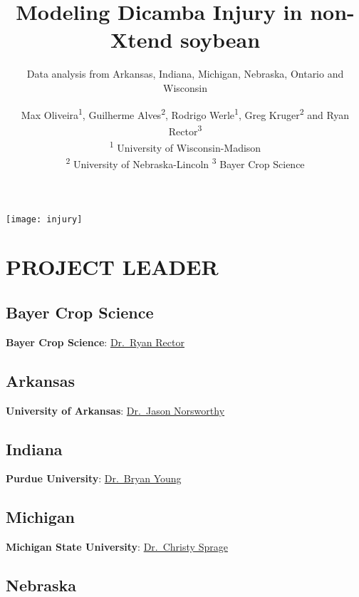 \documentclass[]{article}
\title{Modeling Dicamba Injury in non-Xtend soybean}
\subtitle{Data analysis from Arkansas, Indiana, Michigan, Nebraska, Ontario and
Wisconsin}
\author{Max Oliveira\textsuperscript{1}, Guilherme Alves\textsuperscript{2},
Rodrigo Werle\textsuperscript{1}, Greg Kruger\textsuperscript{2} and
Ryan Rector\textsuperscript{3}\\
\textsuperscript{1} University of Wisconsin-Madison\\
\textsuperscript{2} University of Nebraska-Lincoln \textsuperscript{3}
Bayer Crop Science}
\date{}
\begin{document}
\maketitle

\begin{center}\texttt{[image: injury]} \end{center}

\newpage 

\tableofcontents  \newpage  \listoffigures
\newpage  \listoftables
\newpage

\section{PROJECT LEADER}\label{project-leader}

\subsection{Bayer Crop Science}\label{bayer-crop-science}

\textbf{Bayer Crop Science}:
\href{https://www.cropscience.bayer.com/en}{Dr.~Ryan Rector}

\subsection{Arkansas}\label{arkansas}

\textbf{University of Arkansas}:
\href{https://crop-soil-environmental-sciences.uark.edu/directory/index/uid/jnorswor/name/Jason-Norsworthy/}{Dr.~Jason
Norsworthy}

\subsection{Indiana}\label{indiana}

\textbf{Purdue University}:
\href{https://ag.purdue.edu/btny/Pages/profile.aspx?strAlias=young285}{Dr.~Bryan
Young}

\subsection{Michigan}\label{michigan}

\textbf{Michigan State University}:
\href{https://www.canr.msu.edu/people/christy_sprague}{Dr.~Christy
Sprage}

\subsection{Nebraska}\label{nebraska}
\end{document}
